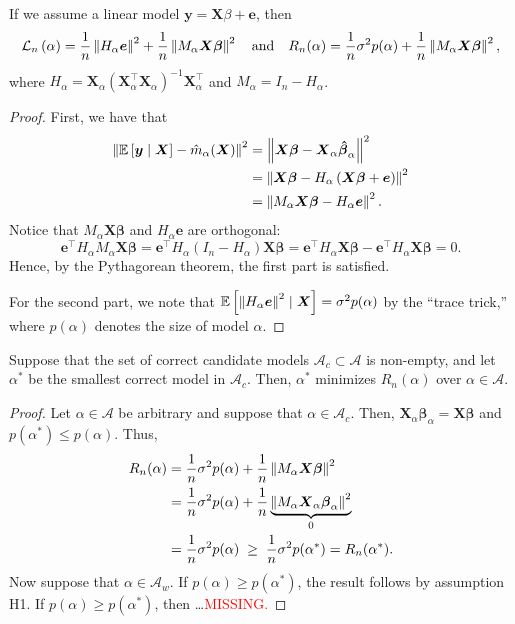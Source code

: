 \documentclass[12pt, letter paper]{article}
\newcommand{\1}{\mathmybb{1}}
\newcommand{\0}{\emptyset}
\newcommand{\Ep}[1]{\mathbb{E}\left[ #1 \right]}
\newcommand{\paren}[1]{\left(#1 \right)}
\newcommand{\norm}[1]{\left|\hspace{-1pt}\left|#1 \right|\hspace{-1pt}\right|}
\newcommand{\normsq}[1]{\norm{#1}^{2}}
\newcommand{\Acal}{\mathcal{A}}
\newcommand{\X}{\boldsymbol{X}}
\newcommand{\y}{\boldsymbol{y}}
\newcommand{\e}{\boldsymbol{e}}
\newcommand{\bbeta}{\boldsymbol{\beta}}
\newcommand{\bbetahat}{\boldsymbol{\hat{\beta}}}
\newcommand{\Loss}[1]{\mathcal{L}_{n}\paren{#1}}
\begin{document}
\begin{proposition}{}
    If we assume a linear model \(\y = \X\beta + \e\), then
    \[\Loss{\alpha} = \frac{1}{n}\normsq{H_{\alpha}\e} + \frac{1}{n}\normsq{M_{\alpha}\X\bbeta}\quad\text{and}\quad R_{n}(\alpha) = \frac{1}{n}\sigma^{2}p(\alpha) + \frac{1}{n}\normsq{M_{\alpha}\X\bbeta},\]
    where \(H_{\alpha} = \X_{\alpha}\paren{\X_{\alpha}^{\top}\X_{\alpha}}^{-1}\X_{\alpha}^{\top}\) and \(M_{\alpha}= I_{n} - H_{\alpha}\).
\end{proposition}
\begin{proof}
    First, we have that
    \begin{align*}
        \normsq{\Ep{\y\mid\X} - \hat{m}_{\alpha}(\X)} &= \normsq{\X\bbeta - \X_{\alpha}\bbetahat_{\alpha}}\\
        &= \normsq{\X\bbeta - H_{\alpha}\paren{\X\bbeta + \e}}\\
        &= \normsq{M_{\alpha}\X\bbeta - H_{\alpha}\e}.
    \end{align*}
    Notice that \(M_{\alpha}\X\bbeta\) and \(H_{\alpha}\e\) are orthogonal:
    \[\e^{\top}H_{\alpha}M_{\alpha}\X\bbeta  = \e^{\top}H_{\alpha}\paren{I_{n} - H_{\alpha}}\X\bbeta = \e^{\top}H_{\alpha}\X\bbeta - \e^{\top}H_{\alpha}\X\bbeta = 0.\]
    Hence, by the Pythagorean theorem, the first part is satisfied.

    For the second part, we note that \(\Ep{\normsq{H_{\alpha}\e}\mid\X} = \sigma^{2}p(\alpha)\) by the ``trace trick,'' where \(p(\alpha)\) denotes the size of model \(\alpha\).
\end{proof}

\begin{proposition}{}
    Suppose that the set of correct candidate models \(\Acal_{c}\subset\Acal\) is non-empty, and let \(\alpha^{*}\) be the smallest correct model in \(\Acal_{c}\). Then, \(\alpha^{*}\) minimizes \(R_{n}(\alpha)\) over \(\alpha\in\Acal\).
\end{proposition}
\begin{proof}
    Let \(\alpha\in\Acal\) be arbitrary and suppose that \(\alpha\in\Acal_{c}\). Then, \(\X_{\alpha}\bbeta_{\alpha} = \X\bbeta\) and \(p(\alpha^{*})\leq p(\alpha)\). Thus,
    \begin{align*}
        R_{n}(\alpha) &= \frac{1}{n}\sigma^{2}p(\alpha) + \frac{1}{n}\normsq{M_{\alpha}\X\bbeta}\\
        &= \frac{1}{n} \sigma^{2}p(\alpha) + \frac{1}{n}\underbrace{\normsq{M_{\alpha}\X_{\alpha}\bbeta_{\alpha}}}_{0}\\
        &= \frac{1}{n}\sigma^{2}p(\alpha)\; \geq \; \frac{1}{n}\sigma^{2}p(\alpha^{*}) = R_{n}(\alpha^{*}).
    \end{align*}
    Now suppose that \(\alpha\in\Acal_{w}\). If \(p(\alpha)\geq p(\alpha^{*})\), the result follows by assumption H1. If \(p(\alpha)\geq p(\alpha^{*})\), then \ldots \textcolor{red}{MISSING.}
\end{proof}
\end{document}
